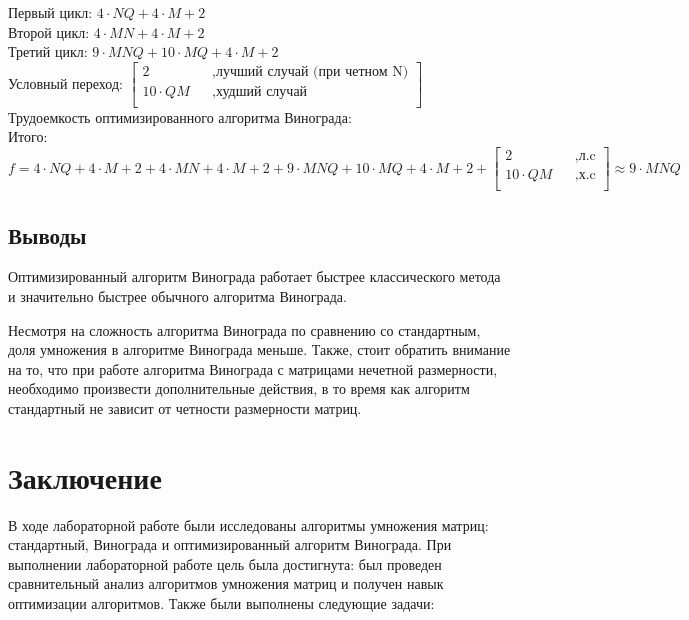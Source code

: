 \documentclass[a4paper,12pt]{article}
\newcommand{\anonsection}[1]{\section*{#1}\addcontentsline{toc}{section}{#1}}
\begin{document}
\begin{enumerate}
		Первый цикл: $4 \cdot N  Q + 4 \cdot M + 2$ \\
		
		Второй цикл: $4 \cdot M  N + 4 \cdot M + 2$\\
		
		Третий цикл: $9 \cdot M  N Q + 10 \cdot M Q + 4 \cdot M + 2$\\
		
		Условный переход: $\begin{bmatrix}
			2   &&, \text{лучший случай (при четном N)}\\
			10 \cdot QM &&, \text{худший случай}\\
		\end{bmatrix} $ \\
		
		Трудоемкость оптимизированного алгоритма Винограда:\\
		
		Итого: $$f = 4 \cdot N  Q + 4 \cdot M + 2 + 4 \cdot M  N + 4 \cdot M + 2 + 9 \cdot M  N Q + 10 \cdot M Q + 4 \cdot M + 2 + \begin{bmatrix}
			2   &&, \text{л.c}\\
			10 \cdot QM &&, \text{х.c}\\
		\end{bmatrix} \approx 9 \cdot MNQ$$
		
		
	\end{enumerate}
	
	\subsection{Выводы}
\hfill

	Оптимизированный алгоритм Винограда работает быстрее классического метода и значительно быстрее обычного алгоритма Винограда. 
	
	Несмотря на сложность алгоритма Винограда по сравнению со стандартным, доля умножения в алгоритме Винограда меньше. Также, стоит обратить внимание на то, что при работе алгоритма Винограда с матрицами нечетной размерности, необходимо произвести дополнительные действия, в то время как алгоритм стандартный не зависит от четности размерности матриц.
	
	\newpage
	
	\anonsection{Заключение}
	\hfill
	
	В ходе лабораторной работе были исследованы алгоритмы умножения матриц: стандартный, Винограда и оптимизированный алгоритм Винограда.
	При выполнении лабораторной работе цель была достигнута: был проведен сравнительный анализ алгоритмов умножения матриц и получен навык оптимизации алгоритмов.
	Также были выполнены следующие задачи: 
	
\end{document}

